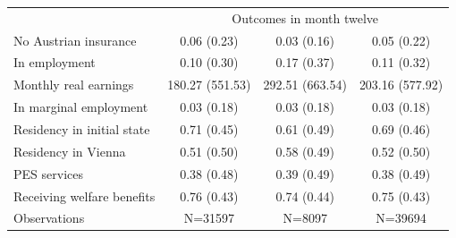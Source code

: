 \begin{tabular}{lccc}
\multicolumn{1}{l}{} & \multicolumn{3}{c}{Outcomes in month twelve} \\
No Austrian insurance & 0.06 (0.23) & 0.03 (0.16) & 0.05 (0.22) \\
In employment & 0.10 (0.30) & 0.17 (0.37) & 0.11 (0.32) \\
Monthly real earnings & 180.27 (551.53) & 292.51 (663.54) & 203.16 (577.92) \\
In marginal employment & 0.03 (0.18) & 0.03 (0.18) & 0.03 (0.18) \\
Residency in initial state & 0.71 (0.45) & 0.61 (0.49) & 0.69 (0.46) \\
Residency in Vienna & 0.51 (0.50) & 0.58 (0.49) & 0.52 (0.50) \\
PES services & 0.38 (0.48) & 0.39 (0.49) & 0.38 (0.49) \\
Receiving welfare benefits & 0.76 (0.43) & 0.74 (0.44) & 0.75 (0.43) \\
\midrule
Observations & N=31597 & N=8097 & N=39694 \\
\bottomrule
\end{tabular}